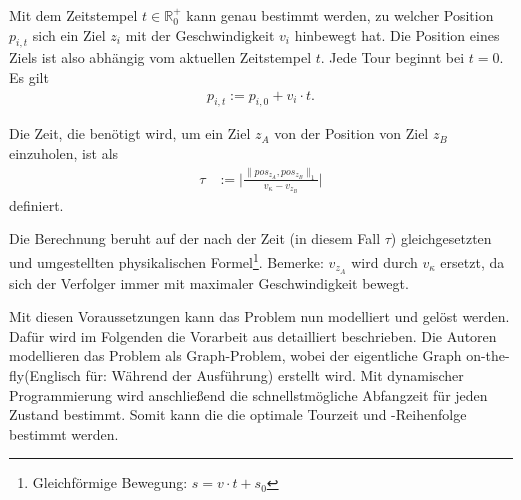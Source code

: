 \documentclass[german,version-2019-11]{uzl-thesis}
\begin{document}
\begin{definition}
\label{def:UpdatedPos}
Mit dem Zeitstempel $t\in \mathbb{R}^+_0$ kann genau bestimmt werden, zu welcher Position $p_{i,t}$ sich ein Ziel $z_i$ mit der Geschwindigkeit $v_i$ hinbewegt hat. Die Position eines Ziels ist also abhängig vom aktuellen Zeitstempel $t$. Jede Tour beginnt bei $t=0$. Es gilt
\begin{align*}
p_{i,t} := p_{i,0} + v_i\cdot t.
\end{align*} 
\end{definition}

\begin{definition}
\label{def:WegZeit}
Die Zeit, die benötigt wird, um ein Ziel $z_A$ von der Position von Ziel $z_B$ einzuholen, ist als
\begin{align*}
\tau &:= \bigg\vert\frac{\|pos_{z_A},pos_{z_B}\|_1}{v_{\kappa}-v_{z_B}}\bigg\vert
\end{align*} 
definiert.
\end{definition}\noindent
Die Berechnung beruht auf der nach der Zeit (in diesem Fall $\tau$) gleichgesetzten und umgestellten physikalischen Formel\footnote{Gleichförmige Bewegung: $s=v\cdot t+s_0$}.
Bemerke: $v_{z_A}$ wird durch $v_{\kappa}$ ersetzt, da sich der Verfolger immer mit maximaler Geschwindigkeit bewegt.

Mit diesen Voraussetzungen kann das Problem nun modelliert und gelöst werden. Dafür wird im Folgenden die Vorarbeit aus \cite{helvig} detailliert beschrieben. Die Autoren modellieren das Problem als Graph-Problem, wobei der eigentliche Graph on-the-fly(Englisch für: Während der Ausführung) erstellt wird. Mit dynamischer Programmierung wird anschließend die schnellstmögliche Abfangzeit für jeden Zustand bestimmt. Somit kann die die optimale Tourzeit und -Reihenfolge bestimmt werden.
\end{document}
